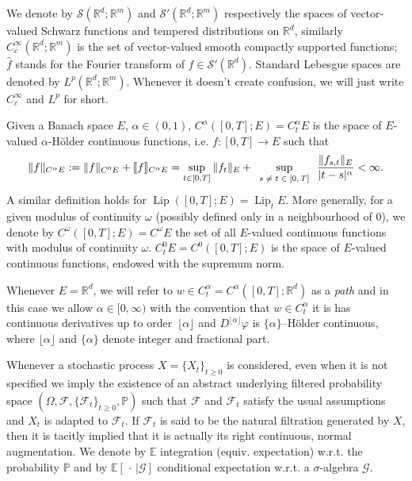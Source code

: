 \documentclass[10pt]{article}
\newcommand{\assign}{:=}
\newcommand{\tmem}[1]{{\em #1\/}}
\newcommand{\tmop}[1]{\ensuremath{\operatorname{#1}}}
\newcommand{\tmscript}[1]{\text{\scriptsize{$#1$}}}
\begin{document}
We denote by $\mathcal{S} (\mathbb{R}^d ; \mathbb{R}^m)$ and $\mathcal{S}'
(\mathbb{R}^d ; \mathbb{R}^m)$ respectively the spaces of vector-valued
Schwarz functions and tempered distributions on $\mathbb{R}^d$, similarly
$C^{\infty}_c (\mathbb{R}^d ; \mathbb{R}^m)$ is the set of vector-valued
smooth compactly supported functions; $\hat{f}$ stands for the Fourier
transform of $f \in \mathcal{S}' (\mathbb{R}^d)$. Standard Lebesgue spaces are
denoted by $L^p (\mathbb{R}^d ; \mathbb{R}^m)$. Whenever it doesn't create
confusion, we will just write $C^{\infty}_c$ and $L^p$ for short.

Given a Banach space $E$, $\alpha \in (0, 1)$, $C^{\alpha} ([0, T] ; E) =
C^{\alpha}_t E$ is the space of $E$-valued $\alpha$-H{\"o}lder continuous
functions, i.e. $f : [0, T] \rightarrow E$ such that
\[ \|f\|_{C^{\alpha} E} \assign \|f\|_{C^0 E} + \llbracket f
   \rrbracket_{C^{\alpha} E} = \sup_{t \in [0, T]} \|f_t \|_E +
   \sup_{\tmscript{\begin{array}{c}
     s \neq t \in [0, T]
   \end{array}}}  \frac{\|f_{s, t} \|_E}{|t - s|^{\alpha}} < \infty . \]
A similar definition holds for $\tmop{Lip} ([0, T] ; E) = \tmop{Lip}_t E$.
More generally, for a given modulus of continuity $\omega$ (possibly defined
only in a neighbourhood of $0$), we denote by $C^{\omega} ([0, T] ; E) =
C^{\omega} E$ the set of all $E$-valued continuous functions with modulus of
continuity $\omega$. $C^0_t E = C^0 ([0, T] ; E)$ is the space of $E$-valued
continuous functions, endowed with the supremum norm.

Whenever $E =\mathbb{R}^d$, we will refer to $w \in C^{\alpha}_t = C^{\alpha}
([0, T] ; \mathbb{R}^d)$ as a {\tmem{path}} and in this case we allow $\alpha
\in [0, \infty)$ with the convention that $w \in C_t^{\alpha}$ it is has
continuous derivatives up to order~$\lfloor \alpha \rfloor$ and $D^{\lfloor
\alpha \rfloor} \varphi$ is $\{\alpha\}$--H{\"o}lder continuous, where
$\lfloor \alpha \rfloor$ and $\{\alpha\}$ denote integer and fractional part.

Whenever a stochastic process $X = \{X_t \}_{t \geqslant 0}$ is considered,
even when it is not specified we imply the existence of an abstract underlying
filtered probability space $(\Omega, \mathcal{F}, \{\mathcal{F}_t \}_{t
\geqslant 0}, \mathbb{P})$ such that $\mathcal{F}$ and $\mathcal{F}_t$ satisfy
the usual assumptions and $X_t$ is adapted to $\mathcal{F}_t$. If
$\mathcal{F}_t$ is said to be the natural filtration generated by $X$, then it
is tacitly implied that it is actually its right continuous, normal
augmentation. We denote by $\mathbb{E}$ integration (equiv. expectation)
w.r.t. the probability $\mathbb{P}$ and by $\mathbb{E} \left[ \, \cdot \, |
\mathcal{G} \right]$ conditional expectation w.r.t. a $\sigma$-algebra
$\mathcal{G}$.
\end{document}

